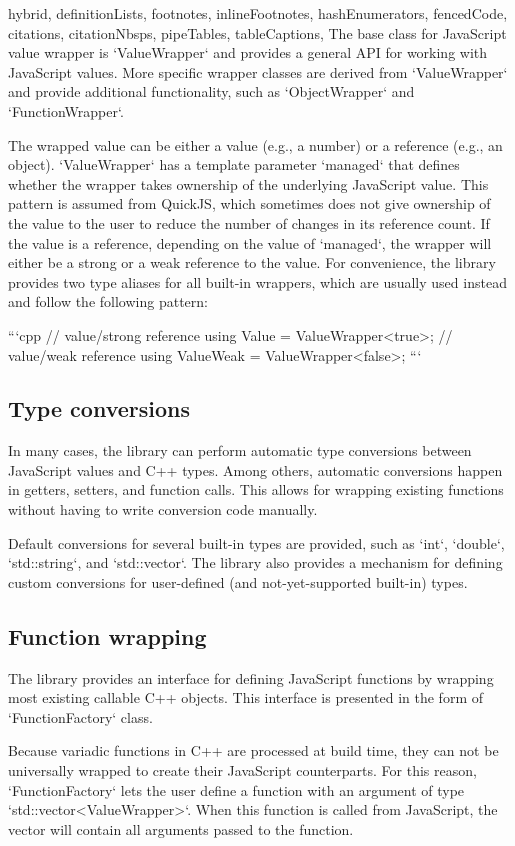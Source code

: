 \begin{markdown*}{%
  hybrid,
  definitionLists,
  footnotes,
  inlineFootnotes,
  hashEnumerators,
  fencedCode,
  citations,
  citationNbsps,
  pipeTables,
  tableCaptions,
}
The base class for JavaScript value wrapper is `ValueWrapper` and provides a general API for working with JavaScript values. More specific wrapper classes are derived from `ValueWrapper` and provide additional functionality, such as `ObjectWrapper` and `FunctionWrapper`.

The wrapped value can be either a value (e.g., a number) or a reference (e.g., an object).
`ValueWrapper` has a template parameter `managed` that defines whether the wrapper takes ownership of the underlying JavaScript value. This pattern is assumed from QuickJS, which sometimes does not give ownership of the value to the user to reduce the number of changes in its reference count. If the value is a reference, depending on the value of `managed`, the wrapper will either be a strong or a weak reference to the value. For convenience, the library provides two type aliases for all built-in wrappers, which are usually used instead and follow the following pattern:

```cpp
// value/strong reference
using Value = ValueWrapper<true>;
// value/weak reference
using ValueWeak = ValueWrapper<false>;
```

\subsection{Type conversions}

In many cases, the library can perform automatic type conversions between JavaScript values and C++ types. Among others, automatic conversions happen in getters, setters, and function calls. This allows for wrapping existing functions without having to write conversion code manually.

Default conversions for several built-in types are provided, such as `int`, `double`, `std::string`, and `std::vector`. The library also provides a mechanism for defining custom conversions for user-defined (and not-yet-supported built-in) types.

\subsection{Function wrapping} \label{sub:func-wrapping}

The library provides an interface for defining JavaScript functions by wrapping most existing callable C++ objects. This interface is presented in the form of `FunctionFactory` class.

Because variadic functions in C++ are processed at build time, they can not be universally wrapped to create their JavaScript counterparts. For this reason, `FunctionFactory` lets the user define a function with an argument of type `std::vector<ValueWrapper>`. When this function is called from JavaScript, the vector will contain all arguments passed to the function.


\end{markdown*}
